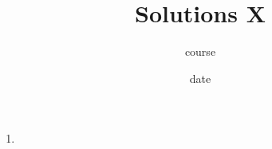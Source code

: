 




\title{Solutions X}
\author[Daniel Gonzalez Cedre]{course}
\date{date}



\maketitle

\begin{enumerate}
    \item
\end{enumerate}


